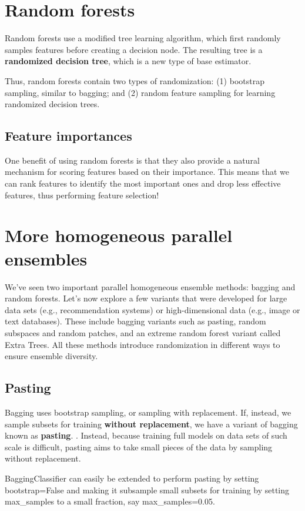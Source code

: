 \section{Random forests}
Random forests use a modified tree learning algorithm, which first randomly samples features before creating a decision node. The resulting tree is a \textbf{randomized decision tree}, which is a new type of base estimator.

Thus, random forests contain two types of randomization: (1) bootstrap sampling, similar to bagging; and (2) random feature sampling for learning randomized decision trees.

\subsection*{Feature importances}
One benefit of using random forests is that they also provide a natural mechanism for scoring features based on their importance. This means that we can rank features to identify the most important ones and drop less effective features, thus performing feature selection!

\section{More homogeneous parallel ensembles}
We’ve seen two important parallel homogeneous ensemble methods: bagging and
random forests. Let’s now explore a few variants that were developed for large data
sets (e.g., recommendation systems) or high-dimensional data (e.g., image or text
databases). These include bagging variants such as pasting, random subspaces and
random patches, and an extreme random forest variant called Extra Trees. All these
methods introduce randomization in different ways to ensure ensemble diversity.
\subsection*{Pasting}
Bagging uses bootstrap sampling, or sampling with replacement. If, instead, we sample subsets for training \textbf{without replacement}, we have a variant of bagging known as \textbf{pasting}. . Instead, because training full models on data sets of such scale is difficult, pasting aims to take small pieces of the data by sampling without replacement.
\begin{tcolorbox}[title=TIP]
    BaggingClassifier can easily be extended to perform pasting by setting bootstrap=False and making it subsample small subsets for training
    by setting max\_samples to a small fraction, say max\_samples=0.05.
\end{tcolorbox}